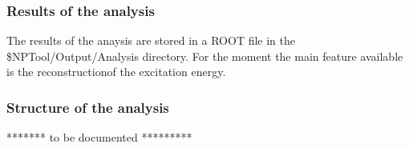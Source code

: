 \documentclass[a4paper,12pt]{article}
\begin{document}
\subsubsection{Results of the analysis}
The results of the anaysis are stored in a ROOT file in the \$NPTool/Output/Analysis
directory. For the moment the main feature available is the reconstructionof the 
excitation energy.


\subsubsection{Structure of the analysis}
******* to be documented *********
\end{document}
